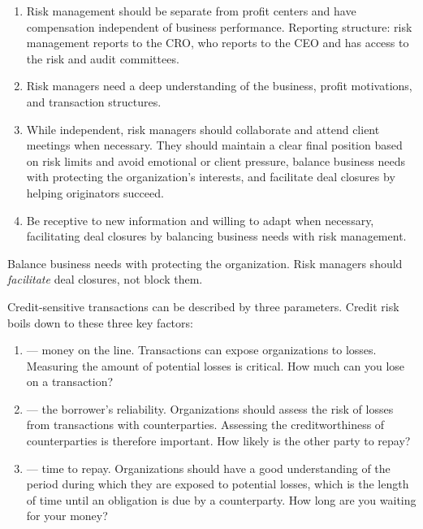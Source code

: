 \begin{enumerate}
\item {} Risk management should be separate from profit
centers and have compensation independent of business performance. Reporting
structure: risk management reports to the CRO, who reports to the CEO and has
access to the risk and audit committees.
\item {} Risk managers need a deep understanding of
the business, profit motivations, and transaction structures.
\item {} While independent, risk managers should
collaborate and attend client meetings when necessary. They should maintain a
clear final position based on risk limits and avoid emotional or client
pressure, balance business needs with protecting the organization's interests,
and facilitate deal closures by helping originators succeed.
\item {} Be receptive to new information and willing to
adapt when necessary, facilitating deal closures by balancing business needs
with risk management.
\end{enumerate}

\begin{crkeybox}
Balance business needs with protecting the organization. Risk managers should
\emph{facilitate} deal closures, not block them.
\end{crkeybox}


Credit-sensitive transactions can be described by three parameters. Credit risk
boils down to these three key factors:

\begin{enumerate}[label=\Alph*.]
\item {} --- money on the line. Transactions can expose
organizations to losses. Measuring the amount of potential losses is critical.
How much can you lose on a transaction?
\item {} --- the borrower's reliability. Organizations should
assess the risk of losses from transactions with counterparties. Assessing the
creditworthiness of counterparties is therefore important. How likely is the
other party to repay?
\item {} --- time to repay. Organizations should
have a good understanding of the period during which they are exposed to
potential losses, which is the length of time until an obligation is due by a
counterparty. How long are you waiting for your money?
\end{enumerate}

